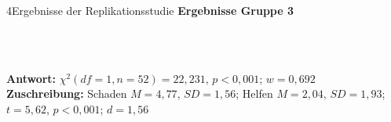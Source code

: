 \documentclass[xcolor=table,9pt,aspectratio=169]{beamer}
\begin{document}
\begin{frame}{\vspace*{10mm}4\hspace*{1em}Ergebnisse der Replikationsstudie}
\textbf{Ergebnisse Gruppe 3}\\
\begin{multicols}{2}
   \begin{center}
      \\
      \\
   \end{center}
\end{multicols}
\textbf{Antwort:} $\chi^2(df=1,n=52)=22,231$, $p<0,001$; $w=0,692$\\

\medskip
\textbf{Zuschreibung:} Schaden $M=4,77$, $SD=1,56$; Helfen $M=2,04$, $SD=1,93$; $t=5,62$, $p<0,001$; $d=1,56$
\end{frame}
\end{document}
